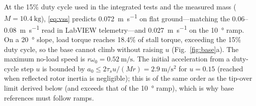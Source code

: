 At the 15\% duty cycle used in the integrated tests and the measured mass ($M=\SI{10.4}{\kilo\gram}$), \eqref{eq:vss} predicts \SI{0.072}{\metre\per\second} on flat ground---matching the 0.06--\SI{0.08}{\metre\per\second} read in LabVIEW telemetry---and \SI{0.027}{\metre\per\second} on the \SI{10}{\degree} ramp. On a \SI{20}{\degree} slope, load torque reaches 18.4\% of stall torque, exceeding the 15\% duty cycle, so the base cannot climb without raising $u$ (Fig.~\ref{fig:base}a). The maximum no-load speed is $r\omega_0=\SI{0.52}{\metre\per\second}$. The initial acceleration from a duty-cycle step $u$ is bounded by $a_0\le 2\tau_su/(Mr)=\SI{2.9}{\metre\per\second\squared}$ for $u=0.15$ (reached when reflected rotor inertia is negligible); this is of the same order as the tip-over limit derived below (and exceeds that of the \SI{10}{\degree} ramp), which is why base references must follow ramps.

